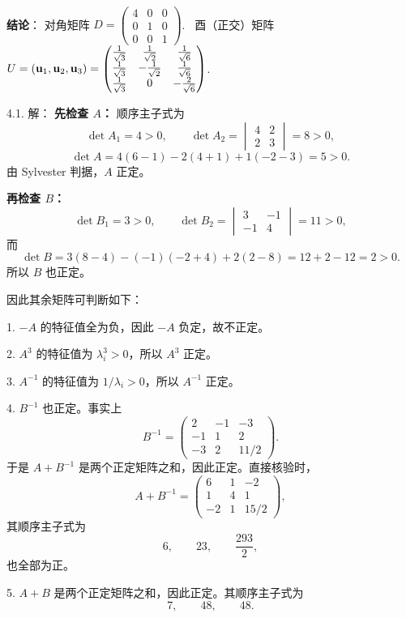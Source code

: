 \begin{exer}
\\
\textbf{结论}：
对角矩阵 $D = \begin{pmatrix} 4 & 0 & 0 \\ 0 & 1 & 0 \\ 0 & 0 & 1 \end{pmatrix}$.~
酉（正交）矩阵 $U = (\mathbf{u}_1, \mathbf{u}_2, \mathbf{u}_3) = \begin{pmatrix} \frac{1}{\sqrt{3}} & \frac{1}{\sqrt{2}} & \frac{1}{\sqrt{6}} \\ \frac{1}{\sqrt{3}} & -\frac{1}{\sqrt{2}} & \frac{1}{\sqrt{6}} \\ \frac{1}{\sqrt{3}} & 0 & -\frac{2}{\sqrt{6}} \end{pmatrix}$.~


\vspace{5ex}

4.1. 解：
\textbf{先检查 $A$：}
顺序主子式为
$$\det A_1=4>0,\qquad
\det A_2=\begin{vmatrix}4&2\\2&3\end{vmatrix}=8>0,$$
$$\det A=4(6-1)-2(4+1)+1(-2-3)=5>0.$$
由 Sylvester 判据，$A$ 正定。

\textbf{再检查 $B$：}
$$\det B_1=3>0,\qquad
\det B_2=\begin{vmatrix}3&-1\\-1&4\end{vmatrix}=11>0,$$
而
$$\det B
=3(8-4)-(-1)(-2+4)+2(2-8)
=12+2-12=2>0.$$
所以 $B$ 也正定。

因此其余矩阵可判断如下：

1. $-A$ 的特征值全为负，因此 $-A$ 负定，故不正定。

2. $A^3$ 的特征值为 $\lambda_i^3>0$，所以 $A^3$ 正定。

3. $A^{-1}$ 的特征值为 $1/\lambda_i>0$，所以 $A^{-1}$ 正定。

4. $B^{-1}$ 也正定。事实上
$$B^{-1}=\begin{pmatrix}2&-1&-3\\-1&1&2\\-3&2&11/2\end{pmatrix}.$$
于是 $A+B^{-1}$ 是两个正定矩阵之和，因此正定。直接核验时，
$$A+B^{-1}=\begin{pmatrix}6&1&-2\\1&4&1\\-2&1&15/2\end{pmatrix},$$
其顺序主子式为
$$6,\qquad23,\qquad\frac{293}{2},$$
也全部为正。

5. $A+B$ 是两个正定矩阵之和，因此正定。其顺序主子式为
$$7,\qquad48,\qquad48.$$


\end{exer}
